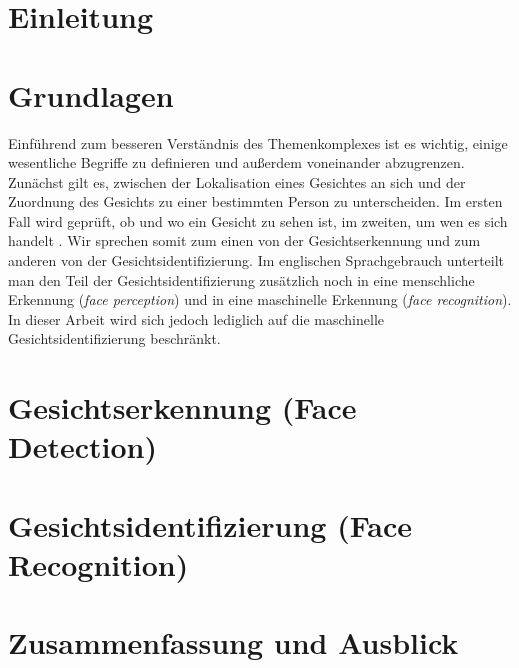 \documentclass[doktyp=semarbeit, sprache=german]{TUBAFarbeiten}
\begin{document}
\maketitle
\tableofcontents
\newpage
\section{Einleitung}
\section{Grundlagen}
Einführend zum besseren Verständnis des Themenkomplexes ist es wichtig, einige wesentliche Begriffe zu definieren und außerdem voneinander abzugrenzen. Zunächst gilt es, zwischen der Lokalisation eines Gesichtes an sich und der Zuordnung des Gesichts zu einer bestimmten Person zu unterscheiden. Im ersten Fall wird geprüft, ob und wo ein Gesicht zu sehen ist, im zweiten, um wen es sich handelt \cite{FaceRecognitionWikipedia}. Wir sprechen somit zum einen von der Gesichtserkennung und zum anderen von der Gesichtsidentifizierung. Im englischen Sprachgebrauch unterteilt man den Teil der Gesichtsidentifizierung zusätzlich noch in eine menschliche Erkennung (\textit{face perception}) und in eine maschinelle Erkennung (\textit{face recognition}). In dieser Arbeit wird sich jedoch lediglich auf die maschinelle Gesichtsidentifizierung beschränkt.
\section{Gesichtserkennung (Face Detection)}
\section{Gesichtsidentifizierung (Face Recognition)}
\section{Zusammenfassung und Ausblick}
{}
\end{document}
